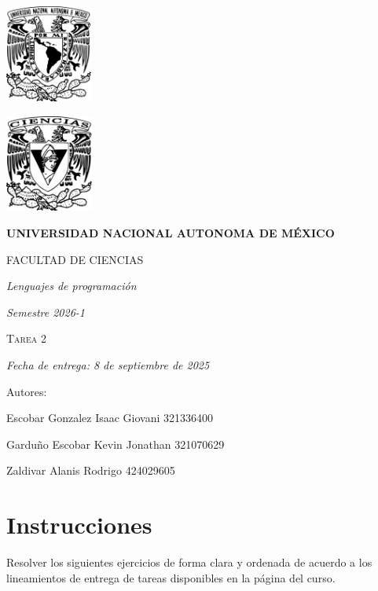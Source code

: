 \documentclass[11pt]{article}
\begin{document}
\begin{titlepage}
    \centering
    \vspace{2cm}
    {\includegraphics[height=3.2cm]{../logo_unam.png}}
    \hfill
    {\includegraphics[height=3.2cm]{../logo_fc.png}\par}
    \vspace{1cm}
    {\bfseries\LARGE UNIVERSIDAD NACIONAL AUTONOMA DE MÉXICO \par}
    \vspace{0.7cm}
    {\scshape\Large FACULTAD DE CIENCIAS \par}
    \vspace{1cm}
    {\itshape\Large Lenguajes de programación \par}
    \vspace{0.5cm}
    {\itshape\Large Semestre 2026-1 \par}
    \vspace{2cm}
    {\scshape\Huge Tarea 2 \par}
    \vspace{1cm}
    {\itshape\Large Fecha de entrega: 8 de septiembre de 2025 \par}
    \vspace{2cm}
    {\Large Autores: \par}
    \vspace{0.4cm}
    {\Large Escobar Gonzalez Isaac Giovani \hspace{1cm} 321336400 \par}
    {\Large Garduño Escobar Kevin Jonathan \hspace{0.5cm} 321070629 \par}
    {\Large Zaldivar Alanis Rodrigo \hspace{2.75cm} 424029605 \par}
\end{titlepage}
\section*{Instrucciones}
\noindent Resolver los siguientes ejercicios de forma clara y ordenada de acuerdo a los lineamientos de entrega de tareas disponibles en la página del curso.\\
\end{document}
